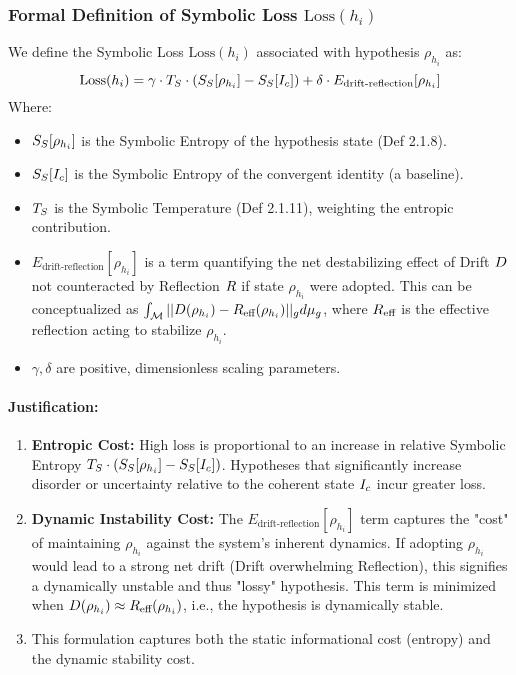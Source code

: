 \subsubsection{Formal Definition of Symbolic Loss \(\text{Loss}
\label{subsubsec:bk7_formal_definition_of_symbolic_loss_loss}(h_i)\)}
We define the Symbolic Loss \(\text{Loss}(h_i)\) associated with hypothesis \(\rho_{h_i}\) as:
\begin{equation}
\text{Loss}(h_i) = \gamma \cdot T_S \cdot (S_S[\rho_{h_i}] - S_S[I_c]) + \delta \cdot E_{\text{drift-reflection}}[\rho_{h_i}]
\end{equation}
Where:
\begin{itemize}
    \item \(S_S[\rho_{h_i}]\) is the Symbolic Entropy of the hypothesis state (Def 2.1.8).
    \item \(S_S[I_c]\) is the Symbolic Entropy of the convergent identity (a baseline).
    \item \(T_S\) is the Symbolic Temperature (Def 2.1.11), weighting the entropic contribution.
    \item \(E_{\text{drift-reflection}}[\rho_{h_i}]\) is a term quantifying the net destabilizing effect of Drift \(D\) not counteracted by Reflection \(R\) if state \(\rho_{h_i}\) were adopted. This can be conceptualized as \(\int_{\mathcal{M}} ||D(\rho_{h_i}) - R_{\text{eff}}(\rho_{h_i})||_g d\mu_{g}\), where \(R_{\text{eff}}\) is the effective reflection acting to stabilize \(\rho_{h_i}\).
    \item \(\gamma, \delta\) are positive, dimensionless scaling parameters.
\end{itemize}
\paragraph{Justification:}
\begin{enumerate}
    \item \textbf{Entropic Cost:} High loss is proportional to an increase in relative Symbolic Entropy \(T_S \cdot (S_S[\rho_{h_i}] - S_S[I_c])\). Hypotheses that significantly increase disorder or uncertainty relative to the coherent state \(I_c\) incur greater loss.
    \item \textbf{Dynamic Instability Cost:} The \(E_{\text{drift-reflection}}[\rho_{h_i}]\) term captures the "cost" of maintaining \(\rho_{h_i}\) against the system's inherent dynamics. If adopting \(\rho_{h_i}\) would lead to a strong net drift (Drift overwhelming Reflection), this signifies a dynamically unstable and thus "lossy" hypothesis. This term is minimized when \(D(\rho_{h_i}) \approx R_{\text{eff}}(\rho_{h_i})\), i.e., the hypothesis is dynamically stable.
    \item This formulation captures both the static informational cost (entropy) and the dynamic stability cost.
\end{enumerate}
